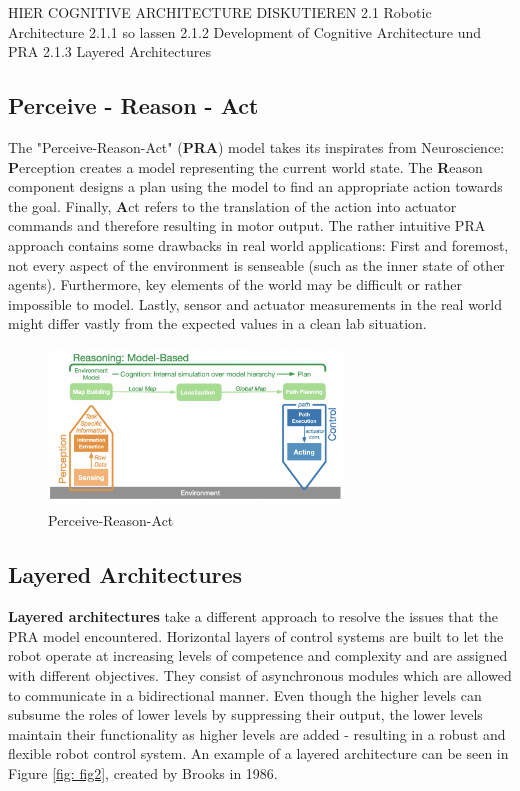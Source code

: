 \documentclass[%
paper=A4,               %
twoside=true,           %
openright,              %
11pt,                   %
bibliography=totoc,     %
titlepage=on,           %
DIV=12,                 %
BCOR=1.5cm,             %
parskip=half,            %
final
]{scrreprt}
\begin{document}
	HIER COGNITIVE ARCHITECTURE DISKUTIEREN
	2.1 Robotic Architecture
	2.1.1 so lassen
	2.1.2 Development of Cognitive Architecture und PRA
	2.1.3 Layered Architectures
	
	\subsection{Perceive - Reason - Act}
	The "Perceive-Reason-Act" (\textbf{PRA}) model takes its inspirates from Neuroscience: \textbf{P}erception creates a model representing the current world state. The \textbf{R}eason component designs a plan using the model to find an appropriate action towards the goal. Finally, \textbf{A}ct refers to the translation of the action into actuator commands and therefore resulting in motor output. \autocite{schillingAutonomeSystemeUnd2023} The rather intuitive PRA approach contains some drawbacks in real world applications: First and foremost, not every aspect of the environment is senseable (such as the inner state of other agents). Furthermore, key elements of the world may be difficult or rather impossible to model. Lastly, sensor and actuator measurements in the real world might differ vastly from the expected values in a clean lab situation. \autocite{schillingAutonomeSystemeUnd2023}
	
	\begin{figure}[ht] 
		\centering
		\includegraphics[width=0.7\textwidth]{Graphics/PRA}
		\caption{Perceive-Reason-Act \autocite{schillingAutonomeSystemeUnd2023}}
		\label{fig: fig1}
	\end{figure}
	
	\subsection{Layered Architectures}
	\textbf{Layered architectures} take a different approach to resolve the issues that the PRA model encountered. Horizontal layers of control systems are built to let the robot operate at increasing levels of competence and complexity and are assigned with different objectives. They consist of asynchronous modules which are allowed to communicate in a bidirectional manner. \autocite{brooksRobustLayeredControl1986} 
	Even though the higher levels can subsume the roles of lower levels by suppressing their output, the lower levels maintain their functionality as higher levels are added - resulting in a robust and flexible robot control system. \autocite{brooksRobustLayeredControl1986} An example of a layered architecture can be seen in Figure \ref{fig: fig2}, created by Brooks in 1986. \autocite{brooksRobustLayeredControl1986}
	
\end{document}
